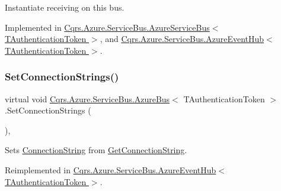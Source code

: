 Instantiate receiving on this bus. 



Implemented in \hyperlink{classCqrs_1_1Azure_1_1ServiceBus_1_1AzureServiceBus_ad49a2d063279ec98443e7f1d69178cfa_ad49a2d063279ec98443e7f1d69178cfa}{Cqrs.\+Azure.\+Service\+Bus.\+Azure\+Service\+Bus$<$ T\+Authentication\+Token $>$}, and \hyperlink{classCqrs_1_1Azure_1_1ServiceBus_1_1AzureEventHub_aa725781eddb65bdfe456a4fecb36fb6b_aa725781eddb65bdfe456a4fecb36fb6b}{Cqrs.\+Azure.\+Service\+Bus.\+Azure\+Event\+Hub$<$ T\+Authentication\+Token $>$}.

\mbox{\label{classCqrs_1_1Azure_1_1ServiceBus_1_1AzureBus_a8a1be9145b0a92c0037ef1b8b4cc79d9_a8a1be9145b0a92c0037ef1b8b4cc79d9}} 
\subsubsection{\texorpdfstring{Set\+Connection\+Strings()}{SetConnectionStrings()}}
{\footnotesize\ttfamily virtual void \hyperlink{classCqrs_1_1Azure_1_1ServiceBus_1_1AzureBus}{Cqrs.\+Azure.\+Service\+Bus.\+Azure\+Bus}$<$ T\+Authentication\+Token $>$.Set\+Connection\+Strings (\begin{DoxyParamCaption}{ }\end{DoxyParamCaption})\hspace{0.3cm}{\ttfamily [protected]}, {\ttfamily [virtual]}}



Sets \hyperlink{classCqrs_1_1Azure_1_1ServiceBus_1_1AzureBus_aaccdbc8cd25d3ae4f1a2801d2ad02a96_aaccdbc8cd25d3ae4f1a2801d2ad02a96}{Connection\+String} from \hyperlink{classCqrs_1_1Azure_1_1ServiceBus_1_1AzureBus_a514e371d5ce093678365af31e6c274e3_a514e371d5ce093678365af31e6c274e3}{Get\+Connection\+String}. 



Reimplemented in \hyperlink{classCqrs_1_1Azure_1_1ServiceBus_1_1AzureEventHub_af823e573f3acc3fa9949969499309db1_af823e573f3acc3fa9949969499309db1}{Cqrs.\+Azure.\+Service\+Bus.\+Azure\+Event\+Hub$<$ T\+Authentication\+Token $>$}.

\mbox{\label{classCqrs_1_1Azure_1_1ServiceBus_1_1AzureBus_a60cbe46aa3e60528dbd7e07be5132132_a60cbe46aa3e60528dbd7e07be5132132}} 
